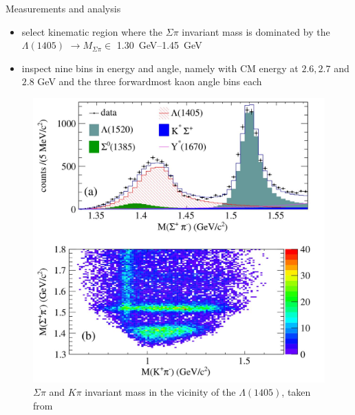 \documentclass[11pt,aspectratio=1610,dvipsnames]{beamer}
\begin{document}
\begin{frame}{Measurements and analysis}
	\begin{minipage}{.4\linewidth}
			\begin{tcolorbox}[colback=black!10,colframe=gray!20!black,title=Event selection] 
			\begin{itemize}
				\item select kinematic region where the $\Sigma\pi$ invariant mass is dominated by the $\Lambda(1405)$ $\to M_{\Sigma\pi}\in$ \SIrange{1.30}{1.45}{\giga\eV}
				\item inspect nine bins in energy and angle, namely with CM energy at $2.6, 2.7$ and $2.8$ GeV and the  three forwardmost kaon angle bins each
			\end{itemize}
		\end{tcolorbox}	
\end{minipage}
\begin{minipage}{.57\linewidth}
	\begin{figure}
		\centering
		\includegraphics[width=\linewidth]{events_pol}
		\caption{$\Sigma\pi$  and $K\pi$ invariant mass in the vicinity of the $\Lambda(1405)$, taken from \citet{spinparity}}
	\end{figure}
\end{minipage}
\end{frame}
\end{document}
